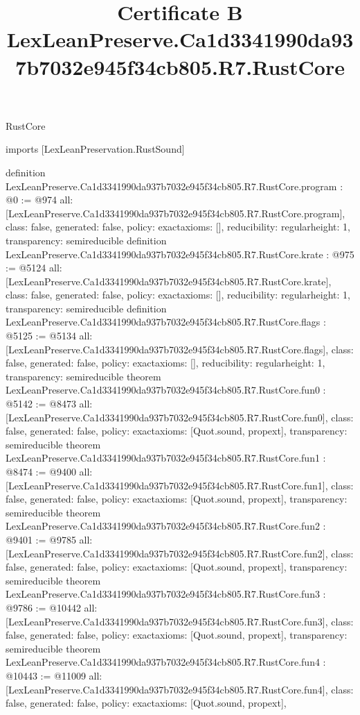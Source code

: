 \begin{lexlean}{RustCore}
\title{Certificate B LexLeanPreserve.Ca1d3341990da937b7032e945f34cb805.R7.RustCore}
\begin{coremodule}
imports [LexLeanPreservation.RustSound]

definition LexLeanPreserve.Ca1d3341990da937b7032e945f34cb805.R7.RustCore.program : @0 := @974 {
  all: [LexLeanPreserve.Ca1d3341990da937b7032e945f34cb805.R7.RustCore.program],
  class: false,
  generated: false,
  policy: exact{axioms: []},
  reducibility: regular{height: 1},
  transparency: semireducible
}
definition LexLeanPreserve.Ca1d3341990da937b7032e945f34cb805.R7.RustCore.krate : @975 := @5124 {
  all: [LexLeanPreserve.Ca1d3341990da937b7032e945f34cb805.R7.RustCore.krate],
  class: false,
  generated: false,
  policy: exact{axioms: []},
  reducibility: regular{height: 1},
  transparency: semireducible
}
definition LexLeanPreserve.Ca1d3341990da937b7032e945f34cb805.R7.RustCore.flags : @5125 := @5134 {
  all: [LexLeanPreserve.Ca1d3341990da937b7032e945f34cb805.R7.RustCore.flags],
  class: false,
  generated: false,
  policy: exact{axioms: []},
  reducibility: regular{height: 1},
  transparency: semireducible
}
theorem LexLeanPreserve.Ca1d3341990da937b7032e945f34cb805.R7.RustCore.fun0 : @5142 := @8473 {
  all: [LexLeanPreserve.Ca1d3341990da937b7032e945f34cb805.R7.RustCore.fun0],
  class: false,
  generated: false,
  policy: exact{axioms: [Quot.sound, propext]},
  transparency: semireducible
}
theorem LexLeanPreserve.Ca1d3341990da937b7032e945f34cb805.R7.RustCore.fun1 : @8474 := @9400 {
  all: [LexLeanPreserve.Ca1d3341990da937b7032e945f34cb805.R7.RustCore.fun1],
  class: false,
  generated: false,
  policy: exact{axioms: [Quot.sound, propext]},
  transparency: semireducible
}
theorem LexLeanPreserve.Ca1d3341990da937b7032e945f34cb805.R7.RustCore.fun2 : @9401 := @9785 {
  all: [LexLeanPreserve.Ca1d3341990da937b7032e945f34cb805.R7.RustCore.fun2],
  class: false,
  generated: false,
  policy: exact{axioms: [Quot.sound, propext]},
  transparency: semireducible
}
theorem LexLeanPreserve.Ca1d3341990da937b7032e945f34cb805.R7.RustCore.fun3 : @9786 := @10442 {
  all: [LexLeanPreserve.Ca1d3341990da937b7032e945f34cb805.R7.RustCore.fun3],
  class: false,
  generated: false,
  policy: exact{axioms: [Quot.sound, propext]},
  transparency: semireducible
}
theorem LexLeanPreserve.Ca1d3341990da937b7032e945f34cb805.R7.RustCore.fun4 : @10443 := @11009 {
  all: [LexLeanPreserve.Ca1d3341990da937b7032e945f34cb805.R7.RustCore.fun4],
  class: false,
  generated: false,
  policy: exact{axioms: [Quot.sound, propext]},
}
\end{coremodule}
\end{lexlean}
